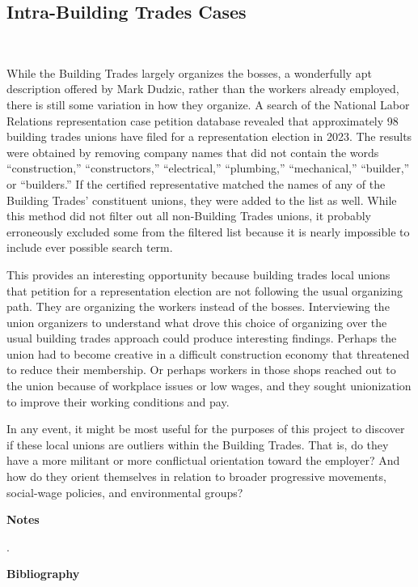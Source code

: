\subsection{Intra-Building Trades Cases} \

While the Building Trades largely organizes the bosses, a wonderfully apt description offered by Mark Dudzic, rather than the workers already employed, there is still some variation in how they organize. A search of the National Labor Relations representation case petition database revealed that approximately 98 building trades unions have filed for a representation election in 2023. The results were obtained by removing company names that did not contain the words “construction,” “constructors,” “electrical,” “plumbing,” “mechanical,” “builder,” or “builders.” If the certified representative matched the names of any of the Building Trades’ constituent unions, they were added to the list as well. While this method did not filter out all non-Building Trades unions, it probably erroneously excluded some from the filtered list because it is nearly impossible to include ever possible search term.

This provides an interesting opportunity because building trades local unions that petition for a representation election are not following the usual organizing path. They are organizing the workers instead of the bosses. Interviewing the union organizers to understand what drove this choice of organizing over the usual building trades approach could produce interesting findings. Perhaps the union had to become creative in a difficult construction economy that threatened to reduce their membership. Or perhaps workers in those shops reached out to the union because of workplace issues or low wages, and they sought unionization to improve their working conditions and pay.

In any event, it might be most useful for the purposes of this project to discover if these local unions are outliers within the Building Trades. That is, do they have a more militant or more conflictual orientation toward the employer? And how do they orient themselves in relation to broader progressive movements, social-wage policies, and environmental groups? 

\newpage

\begin{center}
{\bfseries Notes}
\end{center}

\noindent
.
\newpage
\begin{center}
{\bfseries Bibliography}
\end{center}




